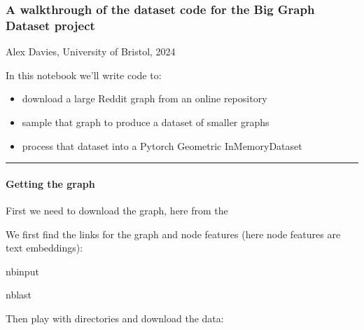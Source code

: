 \documentclass[letterpaper,10pt,english]{sphinxhowto}
\begin{document}
\subsubsection{A walkthrough of the dataset code for the Big Graph Dataset project}
\label{\detokenize{reddit-dataset-example:A-walkthrough-of-the-dataset-code-for-the-Big-Graph-Dataset-project}}
\sphinxAtStartPar
Alex Davies, University of Bristol, 2024

\sphinxAtStartPar
In this notebook we’ll write code to:
\begin{itemize}
\item {} 
\sphinxAtStartPar
download a large Reddit graph from an online repository

\item {} 
\sphinxAtStartPar
sample that graph to produce a dataset of smaller graphs

\item {} 
\sphinxAtStartPar
process that dataset into a Pytorch Geometric InMemoryDataset

\end{itemize}


\bigskip\hrule\bigskip



\paragraph{Getting the graph}
\label{\detokenize{reddit-dataset-example:Getting-the-graph}}
\sphinxAtStartPar
First we need to download the graph, here from the 

\sphinxAtStartPar
We first find the links for the graph and node features (here node features are text embeddings):

\begin{sphinxuseclass}{nbinput}
\begin{sphinxuseclass}{nblast}
{
\begin{sphinxVerbatim}[commandchars=\\\{\}]
\llap{\color{nbsphinxin}[1]:\,\hspace{\fboxrule}\hspace{\fboxsep}}  
  
\end{sphinxVerbatim}
}

\end{sphinxuseclass}
\end{sphinxuseclass}
\sphinxAtStartPar
Then play with directories and download the data:
\end{document}
